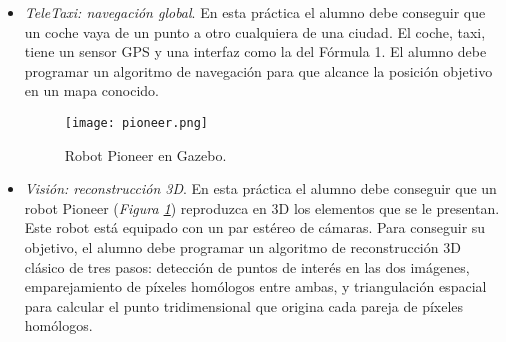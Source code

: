 \begin{itemize}
	\item \textit{TeleTaxi: navegación global}. En esta práctica el alumno debe conseguir que un coche vaya de un punto a otro cualquiera de una ciudad. El coche, taxi, tiene un sensor GPS y una interfaz como la del Fórmula 1. El alumno debe programar un algoritmo de navegación para que alcance la posición objetivo en un mapa conocido.

\begin{figure}[h]
	\centering\texttt{[image: pioneer.png]}
	\caption{Robot Pioneer en Gazebo.}
	\label{fig:pioneer}
\end{figure}
	
	\item \textit{Visión: reconstrucción 3D}. En esta práctica el alumno debe conseguir que un robot Pioneer (\textit{Figura \ref{fig:pioneer}}) reproduzca en 3D los elementos que se le presentan. Este robot está equipado con un par estéreo de cámaras. Para conseguir su objetivo, el alumno debe programar un algoritmo de reconstrucción 3D clásico de tres pasos: detección de puntos de interés en las dos imágenes, emparejamiento de píxeles homólogos entre ambas, y triangulación espacial para calcular el punto tridimensional que origina cada pareja de píxeles homólogos.
\end{itemize}

